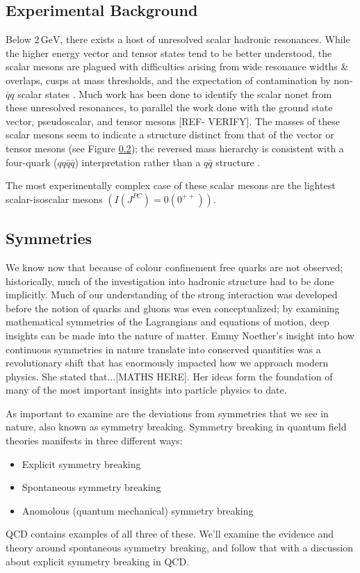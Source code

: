 \documentclass[aps,prd,onecolumn,showpacs,amsmath,amssymb,nofootinbib]{revtex4} \pdfoutput=1
\begin{document}
\subsection{Experimental Background}
Below $2\,\mathrm{GeV}$, there exists a host of unresolved scalar hadronic resonances. While the higher energy vector and tensor states tend to be better understood, the scalar mesons are plagued with difficulties arising from wide resonance widths \& overlaps, cusps at mass thresholds, and the expectation of contamination by non-$\bar{q}q$ scalar states \cite{PDG2014}. Much work has been done to identify the scalar nonet from these unresolved resonances, to parallel the work done with the ground state vector, pseudoscalar, and tensor mesons [REF- VERIFY]. 
The masses of these scalar mesons seem to indicate a structure distinct from that of the vector or tensor mesons (see Figure \ref{}); the reversed mass hierarchy is consistent with a four-quark ($qq\bar{q}\bar{q}$) interpretation rather than a $q\bar{q}$ structure \cite{Fariborz2010,Jaffe1977}. 

The most experimentally complex case of these scalar mesons are the lightest scalar-isoscalar mesons $\left(I(J^{PC})= 0(0^{++})\right)$. 

\subsection{Symmetries}
We know now that because of colour confinement free quarks are not observed; historically, much of the investigation into hadronic structure had to be done implicitly. Much of our understanding of the strong interaction was developed before the notion of quarks and gluons was even conceptualized; by examining mathematical symmetries of the Lagrangians and equations of motion, deep insights can be made into the nature of matter. Emmy Noether's insight into how continuous symmetries in nature translate into conserved quantities was a revolutionary shift that has enormously impacted how we approach modern physics. She stated that...[MATHS HERE]. Her ideas form the foundation of many of the most important insights into particle physics to date.

As important to examine are the deviations from symmetries that we see in nature, also known as symmetry breaking. Symmetry breaking in quantum field theories manifests in three different ways:
\begin{itemize}
    \item Explicit symmetry breaking
    \item Spontaneous symmetry breaking
    \item Anomolous (quantum mechanical) symmetry breaking
\end{itemize}
QCD contains examples of all three of these. We'll examine the evidence and theory around spontaneous symmetry breaking, and follow that with a discussion about explicit symmetry breaking in QCD.
\end{document}
